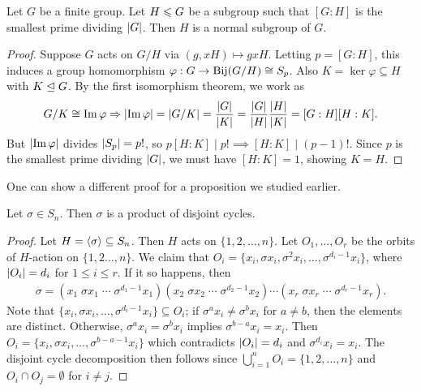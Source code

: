 \begin{proposition}
    Let $G$ be a finite group. Let $H \leqslant G$ be a subgroup such that $[G:H]$ is the smallest prime dividing $\left| G \right|$. Then $H$ is a normal subgroup of $G$.
\end{proposition}

\begin{proof}
    Suppose $G$ acts on $G/H$ via $(g,xH) \mapsto gxH$. Letting $p = [G:H]$, this induces a group homomorphism $\varphi:G \to \operatorname{Bij}(G/H) \cong S_{p}$. Also $K = \ker \varphi \subseteq H$ with $K \trianglelefteq G$. By the first isomorphism theorem, we work as
    \begin{align}
        G/K \cong \operatorname{Im} \varphi \Rightarrow \left| \operatorname{Im} \varphi \right| = \left| G/K \right| = \frac{\left| G \right|}{\left| K \right|} = \frac{\left| G \right|}{\left| H \right|} \frac{\left| H \right|}{\left| K \right|} = [G:H][H:K].
    \end{align}
    But $\left| \operatorname{Im} \varphi \right|$ divides $\left| S_{p} \right| = p!$, so $p[H:K] \mid p! \implies [H:K] \mid (p-1)!$. Since $p$ is the smallest prime dividing $\left| G \right|$, we must have $[H:K] = 1$, showing $K = H$.
\end{proof}

One can show a different proof for a proposition we studied earlier.
\begin{proposition}
    Let $\sigma \in S_{n}$. Then $\sigma$ is a product of disjoint cycles.
\end{proposition}

\begin{proof}
    Let $H = \langle\sigma\rangle \subseteq S_{n}$. Then $H$ acts on $\{1,2,\ldots,n\}$. Let $O_{1},\ldots,O_{r}$ be the orbits of $H$-action on $\{1,2\ldots,n\}$. We claim that $O_{i} = \{x_{i},\sigma x_{i},\sigma^{2}x_{i},\ldots,\sigma^{d_{i}-1}x_{i}\}$, where $\left| O_{i} \right| = d_{i}$ for $1 \leq i \leq r$. If it so happens, then
    \begin{align}
        \sigma = (x_{1}\;\sigma x_{1}\;\cdots\;\sigma^{d_{1}-1}x_{1}) (x_{2}\;\sigma x_{2}\;\cdots\;\sigma^{d_{2}-1}x_{2}) \cdots (x_{r}\;\sigma x_{r}\;\cdots\;\sigma^{d_{r}-1}x_{r}).
    \end{align}
    Note that $\{x_{i},\sigma x_{i},\ldots,\sigma^{d_{i}-1}x_{i}\} \subseteq O_{i}$; if $\sigma^{a}x_{i} \neq \sigma^{b}x_{i}$ for $a \neq b$, then the elements are distinct. Otherwise, $\sigma^{a}x_{i} = \sigma^{b}x_{i}$ implies $\sigma^{b-a}x_{i} = x_{i}$. Then $O_{i} = \{x_{i},\sigma x_{i},\ldots,\sigma^{b-a-1}x_{i}\}$ which contradicts $\left| O_{i} \right| = d_{i}$ and $\sigma^{d_{i}}x_{i} = x_{i}$. The disjoint cycle decomposition then follows since $\bigcup_{i=1}^{n} O_{i} = \{1,2,\ldots,n\}$ and $O_{i} \cap O_{j} = \emptyset$ for $i \neq j$.
\end{proof}

